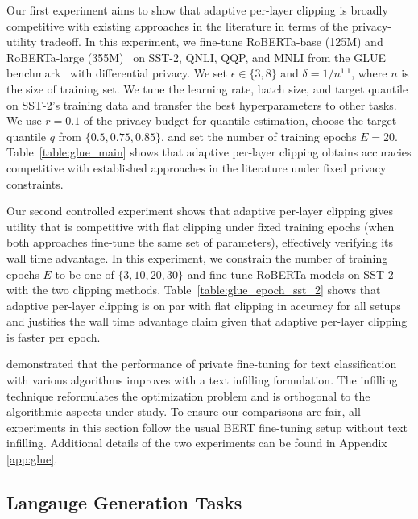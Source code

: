 Our first experiment aims to show that adaptive per-layer clipping is broadly competitive with existing approaches in the literature in terms of the privacy-utility tradeoff. 
In this experiment, we fine-tune RoBERTa-base (125M) and RoBERTa-large (355M)~\citep{liu2019roberta} on SST-2, QNLI, QQP, and MNLI from the GLUE benchmark~\citep{wang2018glue} with differential privacy. 
We set $\epsilon\in \{3,8\}$ and $\delta=1/n^{1.1}$, where $n$ is the size of training set.
We tune the learning rate, batch size, and target quantile on SST-2's training data and transfer the best hyperparameters to other tasks. 
We use $r=0.1$ of the privacy budget for quantile estimation, choose the target quantile $q$ from $\{0.5, 0.75, 0.85\}$, and set the number of training epochs $E=20$.  %
Table~\ref{table:glue_main} shows that adaptive per-layer clipping obtains accuracies competitive with established approaches in the literature under fixed privacy constraints.

Our second controlled experiment shows that adaptive per-layer clipping gives utility that is competitive with flat clipping under fixed training epochs (when both approaches fine-tune the same set of parameters), effectively verifying its wall time advantage. 
In this experiment, we constrain the number of training epochs $E$ to be one of $\{3, 10, 20, 30\}$ and fine-tune RoBERTa models on SST-2 with the two clipping methods.
Table~\ref{table:glue_epoch_sst_2} shows that adaptive per-layer clipping is 
on par with flat clipping in accuracy for all setups and justifies the wall time advantage claim given that adaptive per-layer clipping is faster per epoch. 

\cite{li2022large} demonstrated that the performance of private fine-tuning for text classification with various algorithms improves with a text infilling formulation. 
The infilling technique reformulates the optimization problem and is orthogonal to the algorithmic aspects under study. 
To ensure our comparisons are fair, all experiments in this section follow the usual BERT fine-tuning setup without text infilling. 
Additional details of the two experiments can be found in Appendix \ref{app:glue}.



\subsection{Langauge Generation Tasks} \label{subsec:gpt}


